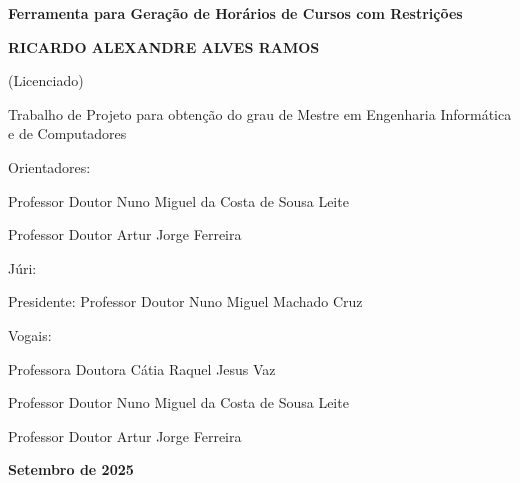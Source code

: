 \documentclass[11pt,a4paper]{report}
\begin{document}
\begin{titlepage}
    \centering
    {\bfseries\fontsize{17}{20}\selectfont Ferramenta para Geração de Horários de Cursos com Restrições}
    \vfill
    
    {\bfseries\fontsize{15}{18}\selectfont RICARDO ALEXANDRE ALVES RAMOS \par}
    {\fontsize{13}{16}\selectfont (Licenciado)}
    \vspace{1cm}
    
    {\fontsize{10}{12}\selectfont Trabalho de Projeto para obtenção do grau de Mestre em Engenharia Informática\\ e de Computadores}
    \vfill

    \begin{center}
        \parbox[h]{0.7\textwidth}{
        \raggedright
            {\hspace{1cm}\fontsize{11}{13}\selectfont Orientadores:}
            
            {\hspace{2cm}\fontsize{10}{12}\selectfont Professor Doutor Nuno Miguel da Costa de Sousa Leite}
            
            {\hspace{2cm}\fontsize{10}{12}\selectfont Professor Doutor Artur Jorge Ferreira}
        }
    \end{center}
    \vfill

    \begin{center}
        \parbox{0.7\textwidth}{
        \raggedright
        {\hspace{1cm}\fontsize{11}{13}\selectfont Júri:}
        
        {\hspace{1.5cm}\fontsize{10}{12}\selectfont Presidente: Professor Doutor Nuno Miguel Machado Cruz}
        
        {\hspace{1.5cm}\fontsize{10}{12}\selectfont Vogais: \par}
        {\hspace{2cm}\fontsize{10}{12}\selectfont Professora Doutora Cátia Raquel Jesus Vaz \par}
        {\hspace{2cm}\fontsize{10}{12}\selectfont Professor Doutor Nuno Miguel da Costa de Sousa Leite \par}
        {\hspace{2cm}\fontsize{10}{12}\selectfont Professor Doutor Artur Jorge Ferreira \par}
        }
    \end{center}

    \vfill
    {\bfseries\fontsize{9}{11} Setembro de 2025 \par}
\end{titlepage}
\end{document}

